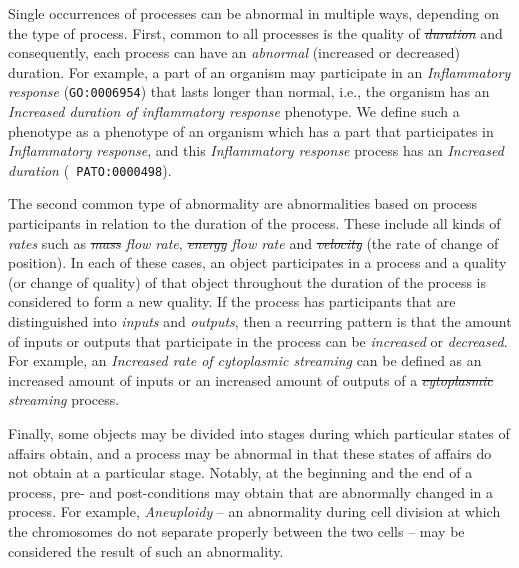 \documentclass{bioinfo}
\providecommand{\DIFadd}[1]{{\protect\color{blue}\uwave{#1}}} %
\providecommand{\DIFdel}[1]{{\protect\color{red}\sout{#1}}}                      %
\providecommand{\DIFaddbegin}{} %
\providecommand{\DIFaddend}{} %
\providecommand{\DIFdelbegin}{} %
\providecommand{\DIFdelend}{} %
\begin{document}
Single occurrences of processes can be abnormal in multiple ways,
depending on the type of process.
%
First, common to all processes is the quality of {\em \DIFdelbegin \DIFdel{duration}\DIFdelend \DIFaddbegin \DIFadd{Duration}\DIFaddend } and
consequently, each process can have an {\em abnormal} (increased or
decreased) duration. For example, a part of an organism may
participate in an {\em Inflammatory response} ({\tt GO:0006954}) that
lasts longer than normal, i.e., the organism has an {\em Increased
  duration of inflammatory response} phenotype. We define such a
phenotype as a phenotype of an organism which has a part that
participates in {\em Inflammatory response}, and this {\em
  Inflammatory response} process has an {\em Increased duration} ({\tt
  PATO:0000498}).

The second common type of abnormality are abnormalities based on
process participants in relation to the duration of the process. These
include all kinds of {\em rates} such as {\em \DIFdelbegin \DIFdel{mass }\DIFdelend \DIFaddbegin \DIFadd{Mass }\DIFaddend flow rate}, {\em
  \DIFdelbegin \DIFdel{energy }\DIFdelend \DIFaddbegin \DIFadd{Energy }\DIFaddend flow rate} and {\em \DIFdelbegin \DIFdel{velocity}\DIFdelend \DIFaddbegin \DIFadd{Velocity}\DIFaddend } (the rate of change of
position). In each of these cases, an object participates in a process
and a quality (or change of quality) of that object throughout the
duration of the process is considered to form a new quality. If the
process has participants that are distinguished into {\em inputs} and
{\em outputs}, then a recurring pattern is that the amount of inputs
or outputs that participate in the process can be {\em increased} or
{\em decreased}. For example, an {\em Increased rate of cytoplasmic
  streaming} can be defined as an increased amount of inputs or an
increased amount of outputs of a {\em \DIFdelbegin \DIFdel{cytoplasmic }\DIFdelend \DIFaddbegin \DIFadd{Cytoplasmic }\DIFaddend streaming} process.

Finally, some objects may be divided into stages during which
particular states of affairs obtain, and a process may be abnormal in
that these states of affairs do not obtain at a particular
stage. Notably, at the beginning and the end of a process, pre- and
post-conditions may obtain that are abnormally changed in a
process. For example, {\em Aneuploidy} -- an abnormality during cell
division at which the chromosomes do not separate properly between the
two cells -- may be considered the result of such an abnormality.
\end{document}
